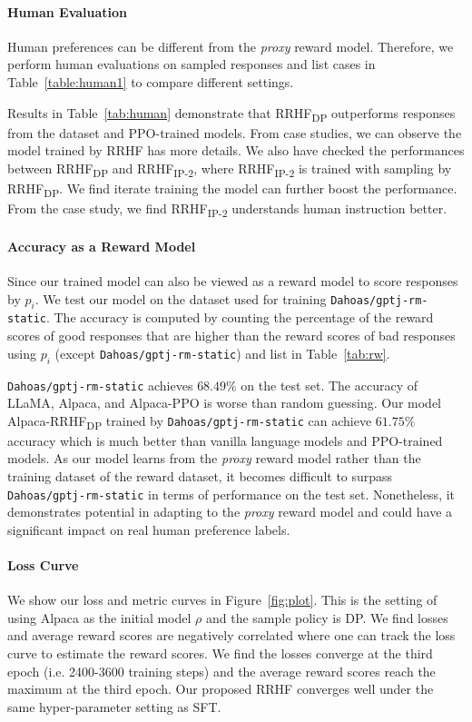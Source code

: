 \paragraph{Human Evaluation} Human preferences can be different from the \textit{proxy} reward model. Therefore, we perform human evaluations on sampled responses and list cases in Table~\ref{table:human1} to compare different settings. 

Results in Table~\ref{tab:human} demonstrate that RRHF\textsubscript{DP} outperforms responses from the dataset and PPO-trained models. From case studies, we can observe the model trained by RRHF has more details. We also have checked the performances between RRHF\textsubscript{DP} and RRHF\textsubscript{IP-2}, where RRHF\textsubscript{IP-2} is trained with sampling by RRHF\textsubscript{DP}. We find iterate training the model can further boost the performance. From the case study, we find RRHF\textsubscript{IP-2} understands human instruction better.

\paragraph{Accuracy as a Reward Model} Since our trained model can also be viewed as a reward model to score responses by $p_i$. We test our model on the dataset used for training \texttt{Dahoas/gptj-rm-static}. The accuracy is computed by counting the percentage of the reward scores of good responses that are higher than the reward scores of bad responses using $p_i$ (except \texttt{Dahoas/gptj-rm-static}) and list in Table~\ref{tab:rw}.

\texttt{Dahoas/gptj-rm-static} achieves $68.49\%$ on the test set. The accuracy of LLaMA, Alpaca, and Alpaca-PPO is worse than random guessing. Our model Alpaca-RRHF\textsubscript{DP} trained by \texttt{Dahoas/gptj-rm-static} can achieve $61.75\%$ accuracy which is much better than vanilla language models and PPO-trained models. As our model learns from the \textit{proxy} reward model rather than the training dataset of the reward dataset, it becomes difficult to surpass \texttt{Dahoas/gptj-rm-static} in terms of performance on the test set. Nonetheless, it demonstrates potential in adapting to the \textit{proxy} reward model and could have a significant impact on real human preference labels.

\paragraph{Loss Curve} We show our loss and metric curves in Figure~\ref{fig:plot}. This is the setting of using Alpaca as the initial model $\rho$ and the sample policy is DP. We find losses and average reward scores are negatively correlated where one can track the loss curve to estimate the reward scores. We find the losses converge at the third epoch (i.e. 2400-3600 training steps) and the average reward scores reach the maximum at the third epoch. Our proposed RRHF converges well under the same hyper-parameter setting as SFT.

